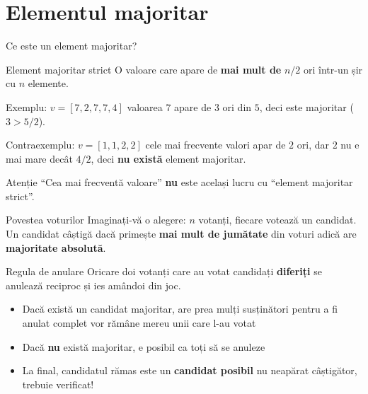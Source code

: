 ﻿\documentclass{beamer}
\begin{document}
\section{Elementul majoritar}

\begin{frame}{Ce este un element majoritar?}
  \begin{block}{Element majoritar strict}
    O valoare care apare de \textbf{mai mult de} $n/2$ ori într-un șir cu $n$ elemente.
  \end{block}

  \smallskip
  Exemplu: $v = [7, 2, 7, 7, 4]$ \textemdash{} valoarea $7$ apare de $3$ ori din $5$, deci este majoritar ($3 > 5/2$).

  \smallskip
  Contraexemplu: $v = [1, 1, 2, 2]$ \textemdash{} cele mai frecvente valori apar de $2$ ori, dar $2$ nu e mai mare decât $4/2$, deci \textbf{nu există} element majoritar.

  \smallskip
  \begin{block}{Atenție}
    ``Cea mai frecventă valoare'' \textbf{nu} este același lucru cu ``element majoritar strict''.
  \end{block}
\end{frame}

\begin{frame}{Povestea voturilor}
  Imaginați-vă o alegere: $n$ votanți, fiecare votează un candidat. Un candidat câștigă dacă primește \textbf{mai mult de jumătate} din voturi \textemdash{} adică are \textbf{majoritate absolută}.

  \smallskip
  \begin{block}{Regula de anulare}
    Oricare doi votanți care au votat candidați \textbf{diferiți} se anulează reciproc și ies amândoi din joc.
  \end{block}

  \smallskip
  \begin{itemize}
    \item Dacă există un candidat majoritar, are prea mulți susținători pentru a fi anulat complet \textemdash{} vor rămâne mereu unii care l-au votat
    \item Dacă \textbf{nu} există majoritar, e posibil ca toți să se anuleze
    \item La final, candidatul rămas este un \textbf{candidat posibil} \textemdash{} nu neapărat câștigător, trebuie verificat!
  \end{itemize}
\end{frame}
\end{document}
